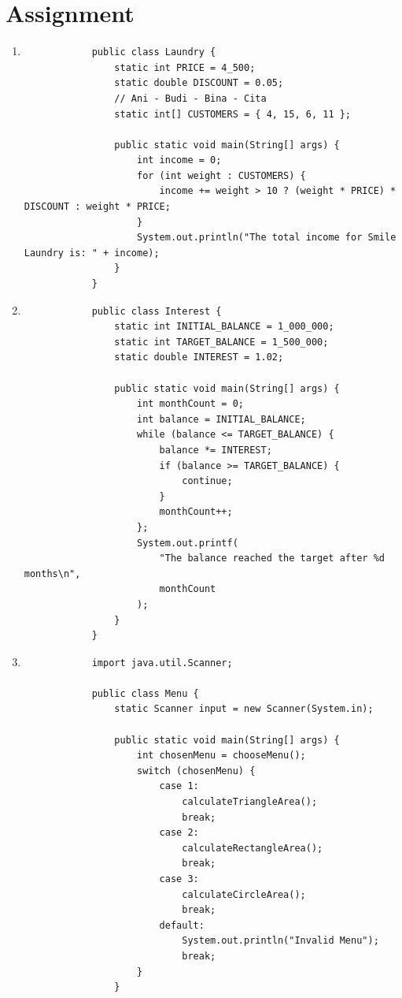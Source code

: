 \documentclass[12pt,titlepage]{article}
\begin{document}
\section*{Assignment}
\begin{enumerate}
    \item {
        \begin{verbatim}
            public class Laundry {
                static int PRICE = 4_500;
                static double DISCOUNT = 0.05;
                // Ani - Budi - Bina - Cita
                static int[] CUSTOMERS = { 4, 15, 6, 11 };

                public static void main(String[] args) {
                    int income = 0;
                    for (int weight : CUSTOMERS) {
                        income += weight > 10 ? (weight * PRICE) * DISCOUNT : weight * PRICE;
                    }
                    System.out.println("The total income for Smile Laundry is: " + income);
                }
            }
        \end{verbatim}
    }
    \item {
        \begin{verbatim}
            public class Interest {
                static int INITIAL_BALANCE = 1_000_000;
                static int TARGET_BALANCE = 1_500_000;
                static double INTEREST = 1.02;

                public static void main(String[] args) {
                    int monthCount = 0;
                    int balance = INITIAL_BALANCE;
                    while (balance <= TARGET_BALANCE) {
                        balance *= INTEREST;
                        if (balance >= TARGET_BALANCE) {
                            continue;
                        }
                        monthCount++;
                    };
                    System.out.printf(
                        "The balance reached the target after %d months\n",
                        monthCount
                    );
                }
            }
        \end{verbatim}
    }
    \item {
        \begin{verbatim}
            import java.util.Scanner;

            public class Menu {
                static Scanner input = new Scanner(System.in);

                public static void main(String[] args) {
                    int chosenMenu = chooseMenu();
                    switch (chosenMenu) {
                        case 1:
                            calculateTriangleArea();
                            break;
                        case 2:
                            calculateRectangleArea();
                            break;
                        case 3:
                            calculateCircleArea();
                            break;
                        default:
                            System.out.println("Invalid Menu");
                            break;
                    }
                }


\end{verbatim}}
\end{enumerate}
\end{document}
